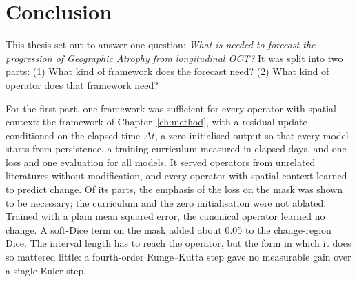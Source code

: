 \cleardoubleoddpage%
\chapter{Conclusion}
\label{ch:conclusion}


This thesis set out to answer one question: \emph{What is needed to
forecast the progression of Geographic Atrophy from longitudinal OCT?} It
was split into two parts: (1) What kind of framework does the forecast
need? (2) What kind of operator does that framework need?

For the first part, one framework was sufficient for every operator with
spatial context: the framework of Chapter~\ref{ch:method}, with a residual
update conditioned on the elapsed time $\Delta t$, a zero-initialised
output so that every model starts from persistence, a training curriculum
measured in elapsed days, and one loss and one evaluation for all models.
It served operators from unrelated literatures without modification, and
every operator with spatial context learned to predict change. Of its
parts, the emphasis of the loss on the mask was shown to be necessary; the
curriculum and the zero initialisation were not ablated. Trained with a
plain mean squared error, the canonical operator learned no change. A soft-Dice term on the mask added about 0.05 to the change-region
Dice. The interval length has to reach the operator, but the form in which
it does so mattered little: a fourth-order Runge--Kutta step gave no
measurable gain over a single Euler step.

